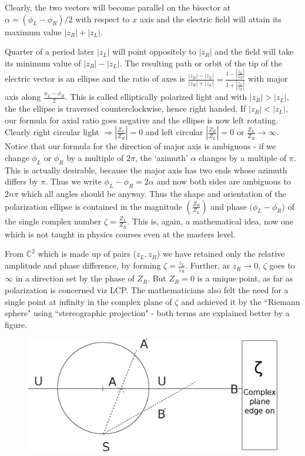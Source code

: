Clearly, the two vectors will become parallel on the bisector at $\alpha = (\phi_L -\phi_R)/2$ 
with respect to $x$ axis and the electric field will attain its maximum value
$| z_R | + | z_L |$.

Quarter of a period later $| z_L |$ will point oppositely to $| z_R |$ and the field
will take its minimum value of $| z_R | - | z_L |$. The resulting path or orbit of the
tip of the electric vector is an ellipse and the ratio of axes is $\frac{|z_R| - |z_L|}{|z_R| + |z_L|} = \frac{1-|\frac{z_L}{z_R}|}{1+|\frac{z_L}{z_R}|}$
with major axis along $\frac{\phi_L -\phi_R}{2}$. This is called elliptically polarized light
and with $|z_R | > |z_L |$, the the ellipse is traversed counterclockwise, hence right
handed. If $|z_R | < |z_L |$, our formula for axial ratio goes negative and the ellipse
is now left rotating. Clearly right circular light $\Rightarrow |\frac{Z_L}{Z_R}| = 0$ and left circular $|\frac{Z_R}{Z_L}| =0$ or $\frac{Z_L}{Z_R} \to \infty$. 
 Notice that our formula for the direction of major axis is
ambiguous - if we change $\phi_L$ or $\phi_R$ by a multiple of $2\pi$, the `azimuth' $\alpha$ changes
by a multiple of $\pi$. This is actually desirable, because the major axis has two
ends whose azimuth differs by $\pi$. Thus we write $\phi_L - \phi_R = 2\alpha$ and now both
sides are ambiguous to $2n\pi$ which all angles should be anyway. Thus the shape
and orientation of the polarization ellipse is contained in the magnitude $\left(\frac{Z_R}{Z_L} \right)$
and phase $(\phi_L - \phi_R$) of the single complex number $\zeta = \frac{Z_L}{Z_R}$. This is, again, a
mathematical idea, now one which is not taught in physics courses even at the
masters level.


From $\mathbb{C}^2$ which is made up of pairs ($z_L , z_R$) we have retained only the relative
amplitude and phase difference, by forming $\zeta = \frac{z_L}{z_R}$. Further, as $z_R \to 0$, $\zeta$
goes to $\infty$ in a direction set by the phase of $Z_R$. But $Z_R = 0$ is a unique point,
as far as polarization is concerned viz LCP. The mathematicians also felt the
need for a single point at infinity in the complex plane of $\zeta$ and achieved it by the 
``Riemann sphere" using  ``stereographic projection" - both terms are explained
better by a figure.
\medskip

\begin{figure}[H]
\centering
\includegraphics[scale=0.2]{src/images/chap26/4.jpg}
\end{figure}
\bigskip

